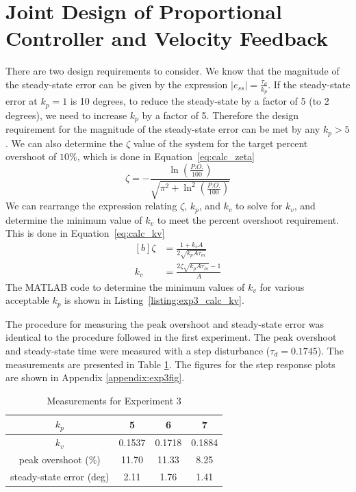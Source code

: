 \documentclass[12pt]{article}
\begin{document}
\section{Joint Design of Proportional Controller and Velocity Feedback}
There are two design requirements to consider. We know that the magnitude of the steady-state error can be given by the expression $\left| e_{ss} \right| = \frac{\tau_d}{k_p}$. If the steady-state error at $k_p = 1$ is 10 degrees, to reduce the steady-state by a factor of 5 (to 2 degrees), we need to increase $k_p$ by a factor of 5. Therefore the design requirement for the magnitude of the steady-state error can be met by any $k_p > 5$. We can also determine the $\zeta$ value of the system for the target percent overshoot of $10\%$, which is done in Equation~\ref{eq:calc_zeta}
\begin{equation} \label{eq:calc_zeta}
    \zeta = -\frac{\ln\left(\frac{P.O.}{100}\right)}{\sqrt{\pi^2 + \ln^2\left(\frac{P.O.}{100}\right)}}
\end{equation}
We can rearrange the expression relating $\zeta$, $k_p$, and $k_v$ to solve for $k_v$, and determine the minimum value of $k_v$ to meet the percent overshoot requirement. This is done in Equation~\ref{eq:calc_kv}
\begin{equation} \label{eq:calc_kv}
\begin{aligned}[b]
    \zeta &= \frac{1+k_vA}{2\sqrt{k_pA\tau_m}} \\
    k_v &= \frac{2\zeta\sqrt{k_pA\tau_m}-1}{A} 
\end{aligned}
\end{equation}
The MATLAB code to determine the minimum values of $k_v$ for various acceptable $k_p$ is shown in Listing~\ref{listing:exp3_calc_kv}.


The procedure for measuring the peak overshoot and steady-state error was identical to the procedure followed in the first experiment. The peak overshoot and steady-state time were measured with a step disturbance ($\tau_d = 0.1745$). The measurements are presented in Table \ref{table:exp3_measurements}. The figures for the step response plots are shown in Appendix \ref{appendix:exp3fig}.

\begin{table}[h!]
\centering
\begin{tabular}{|c|c|c|c|} \hline
    $k_p$ & 5 & 6 & 7 \\ \hline
    $k_v$ & 0.1537 & 0.1718 & 0.1884 \\ \hline
    peak overshoot (\%) & 11.70 & 11.33 & 8.25 \\ \hline
    steady-state error (deg) & 2.11 & 1.76 & 1.41 \\ \hline
\end{tabular}
\caption{\label{table:exp3_measurements}Measurements for Experiment 3}
\end{table}
\end{document}
